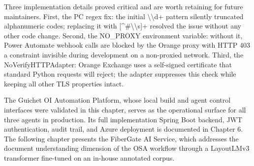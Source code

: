Three implementation details proved critical and are worth retaining for future maintainers. First, the PC regex fix: the initial \textbackslash{}\textbackslash{}d+ pattern silently truncated alphanumeric codes; replacing it with [\textasciicircum{}\#\textbackslash{}\textbackslash{}s]+ resolved the issue without any other code change. Second, the NO\_PROXY environment variable: without it, Power Automate webhook calls are blocked by the Orange proxy with HTTP 403 a constraint invisible during development on a non-proxied network. Third, the NoVerifyHTTPAdapter: Orange Exchange uses a self-signed certificate that standard Python requests will reject; the adapter suppresses this check while keeping all other TLS properties intact.

The Guichet OI Automation Platform, whose local build and agent control interfaces were validated in this chapter, serves as the operational surface for all three agents in production. Its full implementation Spring Boot backend, JWT authentication, audit trail, and Azure deployment is documented in Chapter 6. The following chapter presents the FiberGate AI Service, which addresses the document understanding dimension of the OSA workflow through a LayoutLMv3 transformer fine-tuned on an in-house annotated corpus.
